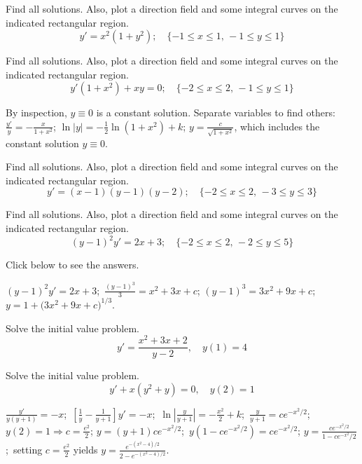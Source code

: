 \documentclass{ximera}
\begin{document}
\begin{problem}\label{exer:2.2.7} Find all solutions. Also, plot a direction field and some integral curves on the indicated rectangular region.
$$y'=x^2(1+y^2);   \quad \{-1\leq x\leq 1,\,-1\leq y\leq 1\}$$
\end{problem}

\begin{problem}\label{exer:2.2.8} Find all solutions. Also, plot a direction field and some integral curves on the indicated rectangular region.
 $$ y'(1+x^2)+xy=0 ;  \quad \{-2\leq x\leq 2,\, -1\leq
y\leq 1\}$$

 

\begin{solution}
    By inspection, $y\equiv0$ is a constant solution. Separate variables
to find others: $\frac{y'}{ y}=-\frac{x}{1+x^2}$;\;
$\ln|y|=-\frac{1}{2}\ln(1+x^2)+k$;\;
 $y=\frac{c}{\sqrt{1+x^2}}$,
which includes the constant solution $y\equiv0$.
\end{solution}
\end{problem}

\begin{problem}\label{exer:2.2.9} Find all solutions. Also, plot a direction field and some integral curves on the indicated rectangular region.
$$y'=(x-1)(y-1)(y-2);   \quad \{-2\leq x\leq 2,\,
-3\leq y\leq 3\}$$
\end{problem}

 \begin{problem}\label{exer:2.2.10} Find all solutions. Also, plot a direction field and some integral curves on the indicated rectangular region.
 $$(y-1)^2y'=2x+3;   \quad \{-2\leq x\leq 2,\, -2\leq
y\leq 5\}$$

Click below to see the answers.

\begin{solution}
    $(y-1)^2y'=2x+3$;\ $\frac{(y-1)^3}{3}=x^2+3x+c$;\;
$(y-1)^3=3x^2+9x+c$;\;
$y=1+\big(3x^2+9x+c)^{1/3}$.
\end{solution}
\end{problem}

\begin{problem}\label{exer:2.2.11} Solve the initial value problem.
$$y'=\frac{x^2+3x+2}{y-2}, \quad y(1)=4$$
\end{problem}

\begin{problem}\label{exer:2.2.12} Solve the initial value problem.
$$y'+x(y^2+y)=0, \quad y(2)=1$$

 

\begin{solution}
    $\frac{y'}{ y(y+1)}=-x$;\ $\left[\frac{1}{ y}-\frac{1}{
y+1}\right]y'=-x$;\ $\ln\left|\frac{y}{
y+1}\right|=-\frac{x^2}{2}+k$;\ $\frac{y}{
y+1}=ce^{-x^2/2}$;\ $y(2)=1\Rightarrow c=\frac{e^2}{2}$;\;
$y=(y+1)ce^{-x^2/2}$;\ $y(1-ce^{-x^2/2})=ce^{-x^2/2}$;\;
$y=\frac{ce^{-x^2/2}}{1-ce^{-x^2}/2}$;\ setting
$c=\frac{e^2}{2}$ yields
 $y=\frac{e^{-(x^2-4)/2}
}{2-e^{-(x^2-4)/2}}$.
\end{solution}
\end{problem}
\end{document}
